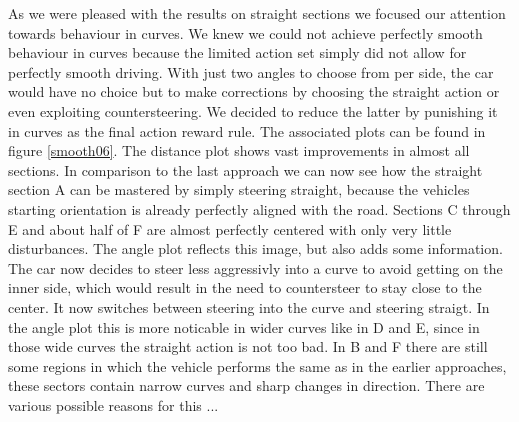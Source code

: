 As we were pleased with the results on straight sections we focused our attention towards behaviour in curves. We knew we could not achieve perfectly smooth behaviour in curves because the limited action set simply did not allow for perfectly smooth driving. With just two angles to choose from per side, the car would have no choice but to make corrections by choosing the straight action or even exploiting countersteering. We decided to reduce the latter by punishing it in curves as the final action reward rule. The associated plots can be found in figure \ref{smooth06}. The distance plot shows vast improvements in almost all sections. In comparison to the last approach we can now see how the straight section A can be mastered by simply steering straight, because the vehicles starting orientation is already perfectly aligned with the road. Sections C through E and about half of F are almost perfectly centered with only very little disturbances. The angle plot reflects this image, but also adds some information. The car now decides to steer less aggressivly into a curve to avoid getting on the inner side, which would result in the need to countersteer to stay close to the center. It now switches between steering into the curve and steering straigt. In the angle plot this is more noticable in wider curves like in D and E, since in those wide curves the straight action is not too bad. In B and F there are still some regions in which the vehicle performs the same as in the earlier approaches, these sectors contain narrow curves and sharp changes in direction. There are various possible reasons for this ...
